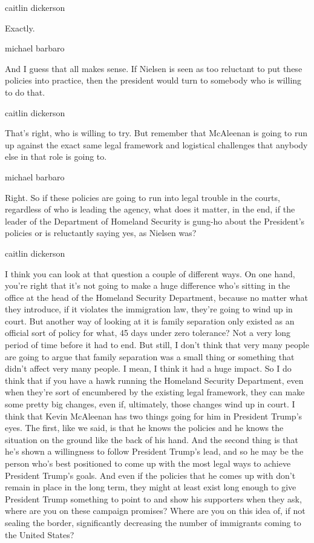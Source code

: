 caitlin dickerson

Exactly.

michael barbaro

And I guess that all makes sense. If Nielsen is seen as too reluctant to
put these policies into practice, then the president would turn to
somebody who is willing to do that.

caitlin dickerson

That's right, who is willing to try. But remember that McAleenan is
going to run up against the exact same legal framework and logistical
challenges that anybody else in that role is going to.

michael barbaro

Right. So if these policies are going to run into legal trouble in the
courts, regardless of who is leading the agency, what does it matter, in
the end, if the leader of the Department of Homeland Security is gung-ho
about the President's policies or is reluctantly saying yes, as Nielsen
was?

caitlin dickerson

I think you can look at that question a couple of different ways. On one
hand, you're right that it's not going to make a huge difference who's
sitting in the office at the head of the Homeland Security Department,
because no matter what they introduce, if it violates the immigration
law, they're going to wind up in court. But another way of looking at it
is family separation only existed as an official sort of policy for
what, 45 days under zero tolerance? Not a very long period of time
before it had to end. But still, I don't think that very many people are
going to argue that family separation was a small thing or something
that didn't affect very many people. I mean, I think it had a huge
impact. So I do think that if you have a hawk running the Homeland
Security Department, even when they're sort of encumbered by the
existing legal framework, they can make some pretty big changes, even
if, ultimately, those changes wind up in court. I think that Kevin
McAleenan has two things going for him in President Trump's eyes. The
first, like we said, is that he knows the policies and he knows the
situation on the ground like the back of his hand. And the second thing
is that he's shown a willingness to follow President Trump's lead, and
so he may be the person who's best positioned to come up with the most
legal ways to achieve President Trump's goals. And even if the policies
that he comes up with don't remain in place in the long term, they might
at least exist long enough to give President Trump something to point to
and show his supporters when they ask, where are you on these campaign
promises? Where are you on this idea of, if not sealing the border,
significantly decreasing the number of immigrants coming to the United
States?

